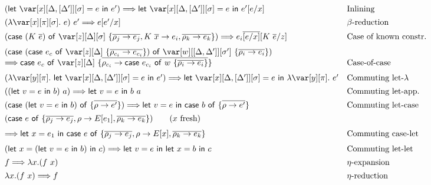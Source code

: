 \documentclass[acmsmall,review,screen]{acmart}
\newcommand{\llet}[2]{\mathsf{let}~#1~\mathsf{in}~#2}
\newcommand{\ccase}[2]{\mathsf{case}~#1~\mathsf{of}~#2}
\begin{document}
\begin{figure}[t]

  {\small
  \[
    \begin{array}{ll}
   (\llet{\xD = e}{e'} )  \Longrightarrow \llet{\xD =       e}{e'[e/x]} &                    \mbox{Inlining}\\[1ex]
       (\lambda \x[\pi][\s].~e)~e'  \Longrightarrow e[e'/x]  &                \mbox{$\beta$-reduction}\\[1ex]
      (\ccase{(K~\ov{e})}{\z[\D][\s]~\{\overline{\rho_j\to e_j}, K~\ov{x} \to e_i, \overline{\rho_k\to e_k}\}} )\Longrightarrow  e_i\ov{[e/x]}[K~\ov{e}/z] &
                                  \mbox{Case of known constr.}\\[1.5ex]
      (\ccase{(\ccase{e_c}{\z[\D]~\{\ov{\rho_{c_i}\to e_{c_i}}\}})}{\var[w][\irr{\D,\D'}][\s']~\{\ov{\rho_i\to e_i}\}})\\
            \Longrightarrow 
      \ccase{e_c}{\z[\D]~\{\ov{\rho_{c_i} \to \ccase{e_{c_i}}{w~\{\ov{\rho_i\to e_i}\}}}\}}
      & \mbox{Case-of-case}\\[1.5ex]
      (\lambda \y[\pi].~\llet{\xD = e}{e'})
      \Longrightarrow
      \llet{\xD=e}{\lambda\y[\pi].~e'} & \mbox{Commuting let-$\lambda$}\\[1ex]
      ((\llet{v = e}{b})~a) \Longrightarrow \llet{v = e}{b~a} &\mbox{Commuting let-app.}\\[1ex]
      (\ccase{(\llet{v = e}{b})}{\{\overline{\rho\to e'}\}}) \Longrightarrow
      \llet{v =  e}{\ccase{b}{\{\overline{\rho\to e'}\}}}
                               &
                                 \mbox{Commuting let-case}\\[1ex]
      (\ccase{e}{\{\overline{\rho_j\to e_j}, \rho \to E[e_1],
      \overline{\rho_k\to e_k}\}} ) \qquad (\mbox{$x$ fresh}) \\[1.5ex]
     \Longrightarrow \llet{x = e_1}{\ccase{e}{\{\overline{\rho_j\to e_j}, \rho \to E[x], \overline{\rho_k\to e_k}\}}} 
                                                                        & \mbox{Commuting case-let}\\[1.5ex]
      (\llet{x = (\llet{v = e}{b})}{c}) \Longrightarrow \llet{v = e}{\llet{x = b}{c}}
                                                                      & \mbox{Commuting let-let}\\[1ex]
      f \Longrightarrow \lambda x.(f~x) & \mbox{$\eta$-expansion}\\[1ex]
      \lambda x.(f~x) \Longrightarrow f & \mbox{$\eta$-reduction}\\[1ex]

\end{array}\]}
\end{figure}
\end{document}
